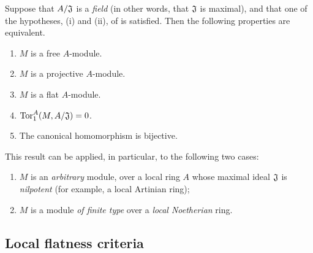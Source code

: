 \begin{env}[10.1.3]
\label{0.10.1.3}
Suppose that $A/\mathfrak{J}$ is a \emph{field} (in other words, that $\mathfrak{J}$ is maximal), and that one of the hypotheses, (i) and (ii), of  is satisfied.
Then the following properties are equivalent.
\begin{enumerate}[label=\emph{(\alph*)}]
    \item $M$ is a free $A$-module.
    \item $M$ is a projective $A$-module.
    \item $M$ is a flat $A$-module.
    \item ${\mathop{\mathrm{Tor}}\nolimits}_1^A(M,A/\mathfrak{J})=0$.
    \item The canonical homomorphism  is bijective.
\end{enumerate}
\end{env}

This result can be applied, in particular, to the following two cases:
\begin{enumerate}[label=(\roman*)]
    \item $M$ is an \emph{arbitrary} module, over a local ring $A$ whose maximal ideal $\mathfrak{J}$ is \emph{nilpotent} (for example, a local Artinian ring);
    \item $M$ is a module \emph{of finite type} over a \emph{local Noetherian} ring.
\end{enumerate}

\subsection{Local flatness criteria}
\label{subsection:local-flatness-criteria}

\begin{env}[10.2.1]
\label{0.10.2.1}
\end{env}
